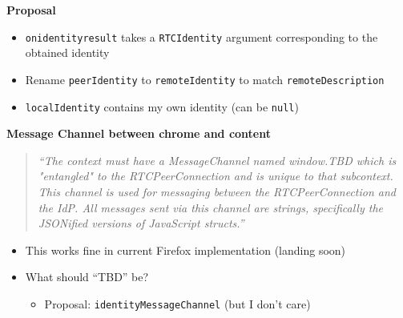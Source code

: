 \documentclass[helvetica]{seminar}
\newcommand{\heading}[1]{%
  \begin{center} 
    \large\bf 
    #1 
  \end{center} 
  \vspace{.4 in}}
\begin{document}
\begin{slide}
\heading{Proposal}

\begin{itemize}
\item \verb^onidentityresult^ takes a \verb^RTCIdentity^ argument corresponding to the obtained identity
\item Rename \verb^peerIdentity^ to \verb^remoteIdentity^ to match \verb^remoteDescription^
\item \verb^localIdentity^ contains my own identity (can be \verb^null^)
\end{itemize}
\end{slide}

\begin{slide}
\heading{Message Channel between chrome and content}

\begin{quote}
\emph{``The context must have a MessageChannel named window.TBD which is "entangled" to the RTCPeerConnection and is unique to that subcontext. This channel is used for messaging between the RTCPeerConnection and the IdP. All messages sent via this channel are strings, specifically the JSONified versions of JavaScript structs.''}\end{quote}

\begin{itemize}
\item This works fine in current Firefox implementation (landing soon)
\item What should ``TBD'' be?
\begin{itemize}
\item Proposal: \verb^identityMessageChannel^ (but I don't care)
\end{itemize}
\end{itemize}
\end{slide}
\end{document}
